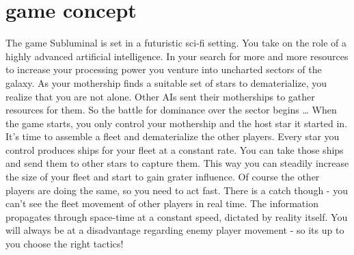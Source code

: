 \chapter*{game concept}
The game Subluminal is set in a futuristic sci-fi setting. You take on the role of a highly advanced artificial intelligence. In your search for more and more resources to increase your processing power you venture into uncharted sectors of the galaxy. As your mothership finds a suitable set of stars to dematerialize, you realize that you are not alone. Other AIs sent their motherships to gather resources for them. So the battle for dominance over the sector begins \ldots
\newline\newline
When the game starts, you only control your mothership and the host star it started in. It's time to assemble a fleet and dematerialize the other players. Every star you control produces ships for your fleet at a constant rate. You can take those ships and send them to other stars to capture them. This way you can steadily increase the size of your fleet and start to gain grater influence. Of course the other players are doing the same, so you need to act fast. There is a catch though - you can't see the fleet movement of other players in real time. The information propagates through space-time at a constant speed, dictated by reality itself. You will always be at a disadvantage regarding enemy player movement - so its up to you choose the right tactics!